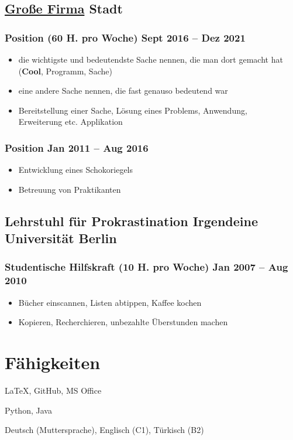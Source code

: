 \documentclass[11pt]{article}
\DeclareRobustCommand{\sbseries}{\fontseries{sb}\selectfont}
\begin{document}
\subsection{\href{https://www.firma.de}{Große Firma} \hfill Stadt}
\subsubsection{Position (60 H. pro Woche) \hfill Sept 2016 -- Dez 2021}
\begin{itemize}
	\item die wichtigste und bedeutendste Sache nennen, die man dort gemacht hat \\
	(\textbf{Cool}, Programm, Sache)
	\item eine andere Sache nennen, die fast genauso bedeutend war
	\item Bereitstellung einer Sache, Lösung eines Problems, Anwendung,\\ Erweiterung etc. Applikation
\end{itemize}

\subsubsection{Position \hfill Jan 2011 -- Aug 2016}
\begin{itemize}
    \item Entwicklung eines Schokoriegels
    \item Betreuung von Praktikanten
\end{itemize}

\subsection{Lehrstuhl für Prokrastination \hfill Irgendeine Universität Berlin}
\subsubsection{Studentische Hilfskraft (10 H. pro Woche) \hfill Jan 2007 -- Aug 2010}
\begin{itemize}
	\item Bücher einscannen, Listen abtippen, Kaffee kochen
	\item Kopieren, Recherchieren, unbezahlte Überstunden machen
\end{itemize}

\section{Fähigkeiten}
\begin{description}[itemsep=1pt, font=\normalfont\sffamily\sbseries]
	\item[Software] \LaTeX, GitHub, MS Office
	\item[Programmiersprachen] Python, Java
	\item[Sprachen] Deutsch (Muttersprache), Englisch (C1), Türkisch (B2)
\end{description}
\end{document}
